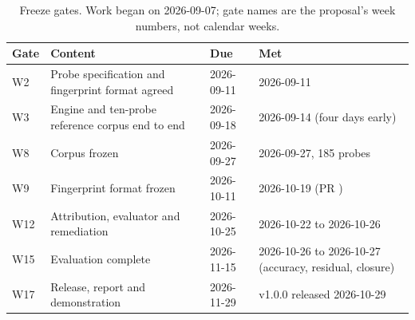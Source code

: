 \begin{table}[htbp]
\centering\small
\begin{tabularx}{\textwidth}{@{}P{1.2cm}P{4.6cm}P{2.2cm}L@{}}
\toprule
\textbf{Gate} & \textbf{Content} & \textbf{Due} & \textbf{Met} \\
\midrule
W2 & Probe specification and fingerprint format agreed & 2026-09-11 & 2026-09-11 \\
W3 & Engine and ten-probe reference corpus end to end & 2026-09-18 & 2026-09-14 (four days early) \\
W8 & Corpus frozen & 2026-09-27 & 2026-09-27, 185 probes \\
W9 & Fingerprint format frozen & 2026-10-11 & 2026-10-19 (PR ) \\
W12 & Attribution, evaluator and remediation & 2026-10-25 & 2026-10-22 to 2026-10-26 \\
W15 & Evaluation complete & 2026-11-15 & 2026-10-26 to 2026-10-27 (accuracy, residual, closure) \\
W17 & Release, report and demonstration & 2026-11-29 & v1.0.0 released 2026-10-29 \\
\bottomrule
\end{tabularx}
\caption{Freeze gates. Work began on 2026-09-07; gate names are the proposal's week numbers, not calendar weeks.}
\label{tab:gates}
\end{table}
